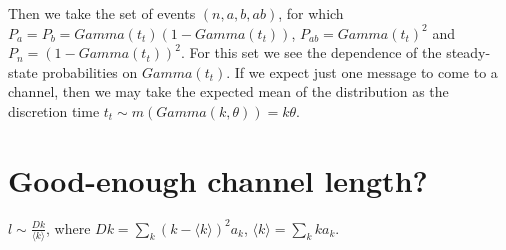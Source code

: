\begin{itemize}
Then we take the set of events $(n,a,b,ab)$, for which $P_{a} = P_{b} = Gamma(t_{t})(1 - Gamma(t_{t}))$, $P_{ab} = Gamma(t_{t})^2$ and $P_{n} = (1 - Gamma(t_{t}))^2$. For this set we see the dependence of the steady-state probabilities on $Gamma(t_{t})$. If we expect just one message to come to a channel, then we may take the expected mean of the distribution as the discretion time $t_{t} \sim m(Gamma(k,\theta)) = k \theta$.
    \end{itemize}

\section{Good-enough channel length?}
$l \sim \frac{Dk}{\langle k \rangle}$, where $Dk = \sum_{k} (k - \langle k \rangle)^{2} a_{k}$, $\langle k \rangle = \sum_{k} k a_{k}$.
